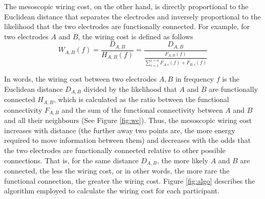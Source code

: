 \documentclass[11pt, onecolumn]{article}
\begin{document}
The mesoscopic wiring cost, on the other hand, is directly proportional to the Euclidean distance that separates the electrodes and inversely proportional to the likelihood that the two electrodes are functionally connected. For example, for two electrodes $A$ and $B$, the wiring cost is defined as follows
\begin{equation}
 W_{A,B}(f) = \frac{D_{A,B}}{H_{A,B}(f)} = \frac{D_{A,B}}{\frac{F_{A,B}(f)}{\sum_{i=1}^{i=n}F_{A,i}(f) + F_{B,i}(f)}}
 \label{eq:mesowc}
\end{equation}

In words, the wiring cost between two electrodes $A,B$ in frequency $f$ is the Euclidean distance $D_{A,B}$ divided by the likelihood that $A$ and $B$ are functionally connected $H_{A,B}$, which is calculated as the ratio between the functional connectivity $F_{A,B}$ and the sum of the functional connectivity between $A$ and $B$ and all their neighbours (See Figure \ref{fig:wc}). Thus, the mesoscopic wiring cost increases with  distance (the further away two points are, the more energy required to move information between them) and decreases with the odds that the two electrodes are functionally connected relative to other possible connections. That is, for the same distance $D_{A,B}$, the more likely $A$ and $B$ are connected, the less the wiring cost, or in other words, the more rare the functional connection, the greater the wiring cost. 
Figure \ref{fig:algo} describes the algorithm employed to calculate the wiring cost for each participant. 
\end{document}
